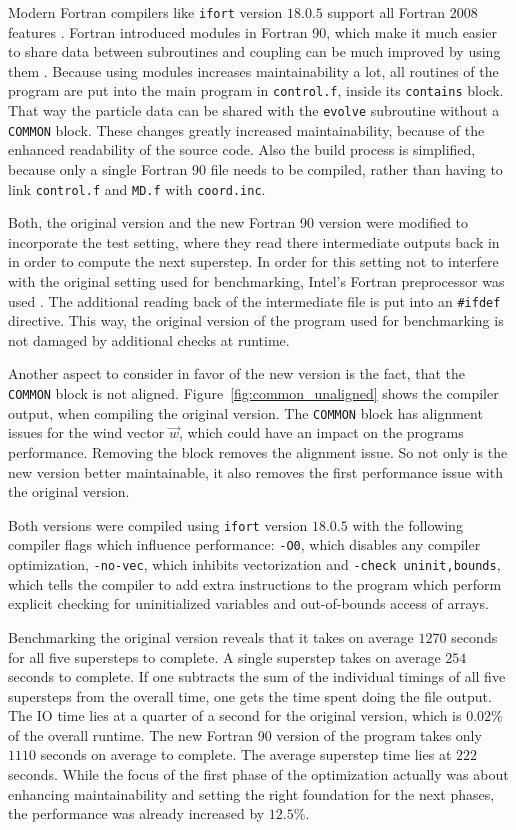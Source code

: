 \documentclass[twoside,11pt]{article}
\begin{document}
Modern Fortran compilers like \texttt{ifort} version $18.0.5$ support
all Fortran 2008 features \citep{ifort18}.
Fortran introduced modules in Fortran 90, which make it much easier
to share data between subroutines and coupling can be much improved by
using them \citep{fortran_modules}.
Because using modules increases maintainability a lot, all routines
of the program are put into the main program in \texttt{control.f},
inside its \texttt{contains} block.
That way the particle data can be shared with the \texttt{evolve}
subroutine without a \texttt{COMMON} block.
These changes greatly increased maintainability, because of the
enhanced readability of the source code.
Also the build process is simplified, because only a single
Fortran 90 file needs to be compiled, rather than having to link
\texttt{control.f} and \texttt{MD.f} with \texttt{coord.inc}.

Both, the original version and the new Fortran 90 version were
modified to incorporate the test setting, where they read there
intermediate outputs back in in order to compute the next superstep.
In order for this setting not to interfere with the original setting
used for benchmarking, Intel's Fortran preprocessor was used
\citep{fpp}.
The additional reading back of the intermediate file is put into an
\texttt{\#ifdef} directive.
This way, the original version of the program used for benchmarking
is not damaged by additional checks at runtime.

Another aspect to consider in favor of the new version is the fact,
that the \texttt{COMMON} block is not aligned.
Figure~\ref{fig:common_unaligned} shows the compiler output, when
compiling the original version.
The \texttt{COMMON} block has alignment issues for the wind vector
$\vec{w}$, which could have an impact on the programs performance.
Removing the block removes the alignment issue.
So not only is the new version better maintainable, it also removes
the first performance issue with the original version.

Both versions were compiled using \texttt{ifort} version $18.0.5$ with
the following compiler flags which influence performance:
\texttt{-O0}, which disables any compiler optimization,
\texttt{-no-vec}, which inhibits vectorization and
\texttt{-check uninit,bounds}, which tells the compiler to add
extra instructions to the program which perform explicit checking
for uninitialized variables and out-of-bounds access of arrays.

Benchmarking the original version reveals that it takes on average
$1270$ seconds for all five supersteps to complete.
A single superstep takes on average $254$ seconds to complete.
If one subtracts the sum of the individual timings of all five
supersteps from the overall time, one gets the time spent doing the
file output.
The IO time lies at a quarter of a second for the original version,
which is $0.02\%$ of the overall runtime.
The new Fortran 90 version of the program takes only $1110$ seconds
on average to complete.
The average superstep time lies at $222$ seconds.
While the focus of the first phase of the optimization actually was
about enhancing maintainability and setting the right foundation for
the next phases, the performance was already increased by $12.5\%$.
\end{document}
